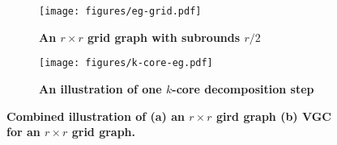 
\begin{figure*}[h]
  \centering
  \vspace{1em}

  \begin{subfigure}{0.4\textwidth}
    \centering
    \texttt{[image: figures/eg-grid.pdf]}
    \vspace{0.3em}
    \caption{\textbf{An $r \times r$ grid graph with subrounds $r/2$}}
    \label{fig:grid_eg}
  \end{subfigure}
  \hfill
  \begin{subfigure}{0.5\textwidth}
    \centering
    \texttt{[image: figures/k-core-eg.pdf]}
    \vspace{0.5em}
    \caption{\textbf{An illustration of one $k$-core decomposition step}}
    \label{fig:kcore_eg}
  \end{subfigure}

  \caption{\textbf{Combined illustration of (a) an $r \times r$ gird graph (b) VGC for an $r \times r$ grid graph.}}
  \label{fig:combined}
\end{figure*}